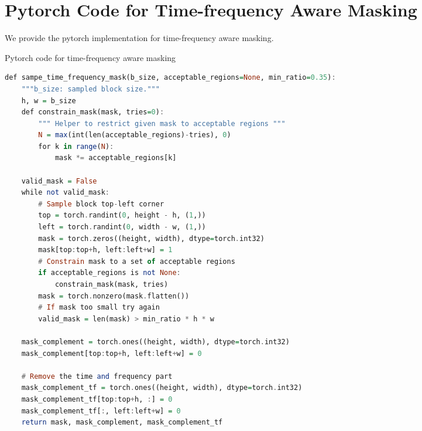 \documentclass{article}
\begin{document}
\section{Pytorch Code for Time-frequency Aware Masking}
We provide the pytorch implementation for time-frequency aware masking.
\begin{listing}[H]%
\caption{Pytorch code for time-frequency aware masking}%
\label{lst:listing}%
\begin{lstlisting}[language=Haskell]
def sampe_time_frequency_mask(b_size, acceptable_regions=None, min_ratio=0.35):
    """b_size: sampled block size."""
    h, w = b_size
    def constrain_mask(mask, tries=0):
        """ Helper to restrict given mask to acceptable regions """
        N = max(int(len(acceptable_regions)-tries), 0)
        for k in range(N):
            mask *= acceptable_regions[k]

    valid_mask = False
    while not valid_mask:
        # Sample block top-left corner
        top = torch.randint(0, height - h, (1,))
        left = torch.randint(0, width - w, (1,))
        mask = torch.zeros((height, width), dtype=torch.int32)
        mask[top:top+h, left:left+w] = 1
        # Constrain mask to a set of acceptable regions
        if acceptable_regions is not None:
            constrain_mask(mask, tries)
        mask = torch.nonzero(mask.flatten())
        # If mask too small try again
        valid_mask = len(mask) > min_ratio * h * w

    mask_complement = torch.ones((height, width), dtype=torch.int32)
    mask_complement[top:top+h, left:left+w] = 0

    # Remove the time and frequency part
    mask_complement_tf = torch.ones((height, width), dtype=torch.int32)
    mask_complement_tf[top:top+h, :] = 0
    mask_complement_tf[:, left:left+w] = 0
    return mask, mask_complement, mask_complement_tf
\end{lstlisting}
\end{listing}
\end{document}

